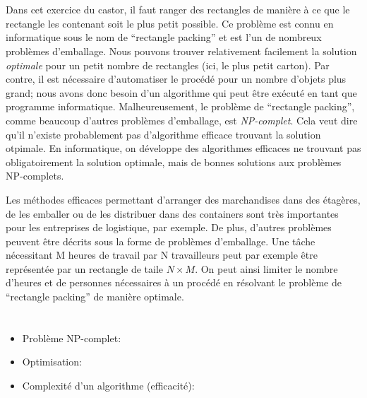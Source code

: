 {{\section*{\BrochureItsInformatics}
Dans cet exercice du castor, il faut ranger des rectangles de manière à ce que le rectangle les contenant soit le plus petit possible. Ce problème est connu en informatique sous le nom de “rectangle packing” et est l’un de nombreux problèmes d’emballage. Nous pouvons trouver relativement facilement la solution \emph{optimale} pour un petit nombre de rectangles (ici, le plus petit carton). Par contre, il est nécessaire d’automatiser le procédé pour un nombre d’objets plus grand; nous avons donc besoin d’un algorithme qui peut être exécuté en tant que programme informatique. Malheureusement, le problème de “rectangle packing”, comme beaucoup d’autres problèmes d’emballage, est \emph{NP-complet}. Cela veut dire qu’il n’existe probablement pas d’algorithme efficace trouvant la solution otpimale. En informatique, on développe des algorithmes efficaces ne trouvant pas obligatoirement la solution optimale, mais de bonnes solutions aux problèmes NP-complets.

Les méthodes efficaces permettant d’arranger des marchandises dans des étagères, de les emballer ou de les distribuer dans des containers sont très importantes pour les entreprises de logistique, par exemple. De plus, d’autres problèmes peuvent être décrits sous la forme de problèmes d’emballage. Une tâche nécessitant M heures de travail par N travailleurs peut par exemple être représentée par un rectangle de taile ${N \times M}$. On peut ainsi limiter le nombre d’heures et de personnes nécessaires à un procédé en résolvant le problème de “rectangle packing” de manière optimale.



\section*{\BrochureWebsitesAndKeywords}
{\raggedright
\begin{itemize}
  \item Problème NP-complet: \href{https://fr.wikipedia.org/wiki/Probl\%C3\%A8me_NP-complet}{}
  \item Optimisation: \href{https://fr.wikipedia.org/wiki/Optimisation_(math\%C3\%A9matiques)}{}
  \item Complexité d’un algorithme (efficacité): \href{https://fr.wikipedia.org/wiki/Analyse_de_la_complexit\%C3\%A9_des_algorithmes}{}
\end{itemize}


}}}
